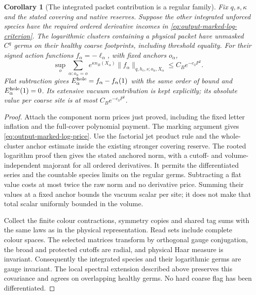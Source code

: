 \documentclass[11pt,reqno]{amsart}
\numberwithin{equation}{section}
\newtheorem{corollary}[theorem]{Corollary}
\theoremstyle{definition}
\theoremstyle{remark}
\begin{document}
\begin{corollary}[The integrated packet contribution is a regular family]
\label{cor:output-packet-regular-family}
Fix \(q,s,\kappa\) and the stated covering and native reserves.
Suppose the other integrated unforced species have the required
ordered derivative incomes in
\eqref{eq:output-marked-log-criterion}. The logarithmic clusters
containing a physical packet have unmasked \(C^q\) germs on
their healthy coarse footprints, including threshold equality.
For their signed action functions \(f_\alpha=-\ell_\alpha\),
with fixed anchors \(o_\alpha\),
\begin{equation}
 \sup_o\sum_{\alpha:o_\alpha=o}e^{\kappa n_B(X_\alpha)}
       \|f_\alpha\|_{q,h_c,s;o_\alpha,X_\alpha}
                                                    \le C_Be^{-c_3P^2}.
 \label{eq:output-packet-regular-family}
\end{equation}
Flat subtraction gives \(E_\alpha^{\rm hole}=f_\alpha-f_\alpha(1)\)
with the same order of bound and \(E_\alpha^{\rm hole}(1)=0\).
Its extensive vacuum contribution is kept explicitly; its
absolute value per coarse site is at most \(C_Be^{-c_3P^2}\).
\end{corollary}
\begin{proof}
Attach the component norm prices just proved, including the
fixed letter inflation and the full-cover polynomial payment.
The marking argument gives
\eqref{eq:output-marked-log-price}. Use the factorial jet
product rule and the whole-cluster anchor estimate inside
the existing stronger covering reserve. The rooted logarithm
proof then gives the stated anchored norm, with a cutoff- and
volume-independent majorant for all ordered derivatives.
It permits the differentiated series and the countable
species limits on the regular germs. Subtracting a flat value
costs at most twice the raw norm and no derivative price.
Summing their values at a fixed anchor bounds the vacuum
scalar per site; it does not make that total scalar uniformly
bounded in the volume.

Collect the finite colour contractions, symmetry copies and
shared tag sums with the same laws as in the physical
representation. Read sets include complete colour spaces.
The selected matrices transform by orthogonal gauge
conjugation, the broad and protected cutoffs are radial, and
physical Haar measure is invariant. Consequently the
integrated species and their logarithmic germs are gauge
invariant. The local spectral extension described above
preserves this covariance and agrees on overlapping healthy
germs. No hard coarse flag has been differentiated.
\end{proof}
\end{document}
